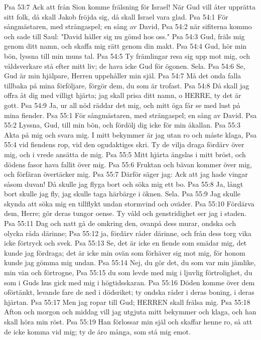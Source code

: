 Psa 53:7  Ack att från Sion komme frälsning för Israel! När Gud vill åter upprätta sitt folk, då skall Jakob fröjda sig, då skall Israel vara glad.
Psa 54:1  För sångmästaren, med strängaspel; en sång av David,
Psa 54:2  när sifiterna kommo och sade till Saul: "David håller sig nu gömd hos oss."
Psa 54:3  Gud, fräls mig genom ditt namn, och skaffa mig rätt genom din makt.
Psa 54:4  Gud, hör min bön, lyssna till min muns tal.
Psa 54:5  Ty främlingar resa sig upp mot mig, och våldsverkare stå efter mitt liv; de hava icke Gud för ögonen. Sela.
Psa 54:6  Se, Gud är min hjälpare, Herren uppehåller min själ.
Psa 54:7  Må det onda falla tillbaka på mina förföljare, förgör dem, du som är trofast.
Psa 54:8  Då skall jag offra åt dig med villigt hjärta; jag skall prisa ditt namn, o HERRE, ty det är gott.
Psa 54:9  Ja, ur all nöd räddar det mig, och mitt öga får se med lust på mina fiender.
Psa 55:1  För sångmästaren, med strängaspel; en sång av David.
Psa 55:2  Lyssna, Gud, till min bön, och fördölj dig icke för min åkallan.
Psa 55:3  Akta på mig och svara mig. I mitt bekymmer är jag utan ro och måste klaga,
Psa 55:4  vid fiendens rop, vid den ogudaktiges skri. Ty de vilja draga fördärv över mig, och i vrede ansätta de mig.
Psa 55:5  Mitt hjärta ängslas i mitt bröst, och dödens fasor hava fallit över mig.
Psa 55:6  Fruktan och bävan kommer över mig, och förfäran övertäcker mig.
Psa 55:7  Därför säger jag: Ack att jag hade vingar såsom duvan! Då skulle jag flyga bort och söka mig ett bo.
Psa 55:8  Ja, långt bort skulle jag fly, jag skulle taga härbärge i öknen. Sela.
Psa 55:9  Jag skulle skynda att söka mig en tillflykt undan stormvind och oväder.
Psa 55:10  Fördärva dem, Herre; gör deras tungor oense. Ty våld och genstridighet ser jag i staden.
Psa 55:11  Dag och natt gå de omkring den, ovanpå dess murar, ondska och olycka råda därinne;
Psa 55:12  ja, fördärv råder därinne, och från dess torg vika icke förtryck och svek.
Psa 55:13  Se, det är icke en fiende som smädar mig, det kunde jag fördraga; det är icke min ovän som förhäver sig mot mig, för honom kunde jag gömma mig undan.
Psa 55:14  Nej, du gör det, du som var min jämlike, min vän och förtrogne,
Psa 55:15  du som levde med mig i ljuvlig förtrolighet, du som i Guds hus gick med mig i högtidsskaran.
Psa 55:16  Döden komme över dem oförtänkt, levande fare de ned i dödsriket; ty ondska råder i deras boning, i deras hjärtan.
Psa 55:17  Men jag ropar till Gud; HERREN skall frälsa mig.
Psa 55:18  Afton och morgon och middag vill jag utgjuta mitt bekymmer och klaga, och han skall höra min röst.
Psa 55:19  Han förlossar min själ och skaffar henne ro, så att de icke komma vid mig; ty de äro många, som stå mig emot.
